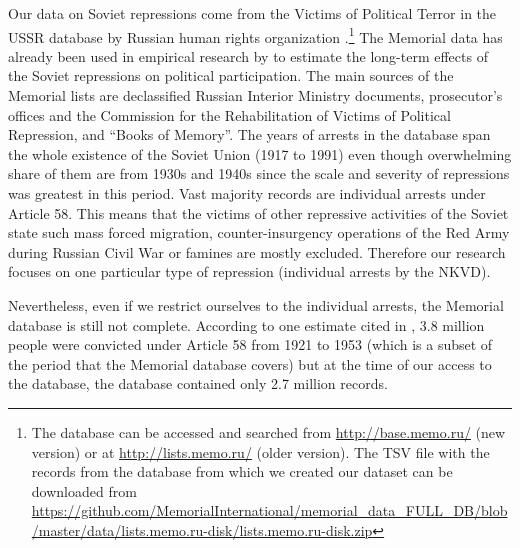 Our data on Soviet repressions come from  the Victims of Political Terror in the USSR database by  Russian human rights organization \citet{memorial_zhertvy_2017}.\footnote{The database can be accessed and searched from  \url{http://base.memo.ru/} (new version) or at \url{http://lists.memo.ru/} (older version). The TSV file with the records from the database from which we created our dataset can be downloaded from \url{https://github.com/MemorialInternational/memorial_data_FULL_DB/blob/master/data/lists.memo.ru-disk/lists.memo.ru-disk.zip}} 
The Memorial data has already been used in empirical research by \citet{zhukov_stalins_2018} to estimate the long-term  effects of the Soviet repressions on  political participation. 
 The main sources of the Memorial lists are declassified Russian Interior Ministry documents, prosecutor’s offices and the Commission for the Rehabilitation of Victims of Political Repression, and \enquote{Books of Memory}. The years of arrests in the database span the whole existence of the Soviet Union (1917 to 1991) even though overwhelming share of them are from 1930s and 1940s since the scale and severity of repressions was greatest in this period. 
Vast  majority records are individual arrests under  Article 58. 
This means that the victims of other repressive activities of the Soviet state such mass forced migration, counter-insurgency operations of the Red Army during Russian Civil War or famines are mostly excluded. Therefore our research focuses on one  particular type of repression (individual arrests by the NKVD). 

Nevertheless, even if we restrict ourselves to the individual arrests, the Memorial database is still not complete.
According to one estimate cited in \citep[p. 270]{zhukov_stalins_2018},   3.8 million people were convicted under Article 58 from 1921 to 1953 (which is a subset of the period that the Memorial database covers) but
at the time of our access to the database, the database contained only 2.7 million records. 


